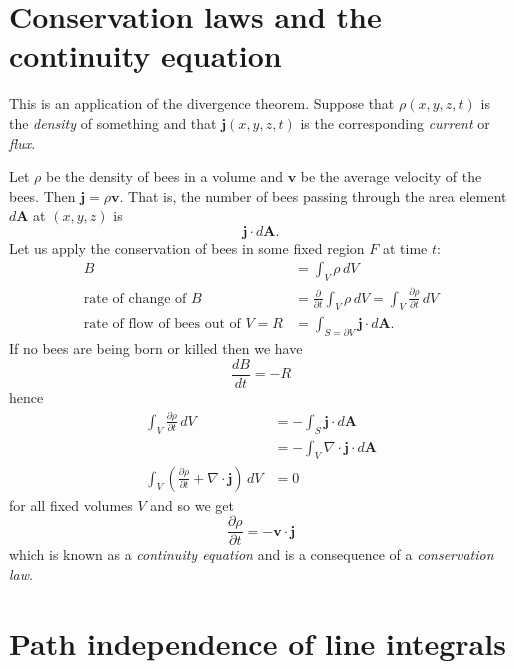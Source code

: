 \section{Conservation laws and the continuity equation}

This is an application of the divergence theorem.
Suppose that $\rho(x,y,z,t)$ is the \emph{density} of something
and that $\bm j(x,y,z,t)$ is the corresponding \emph{current} or \emph{flux}.

\begin{example}[Bees]
    Let $\rho$ be the density of bees in a volume
    and $\bm v$ be the average velocity of the bees.
    Then $\bm j = \rho \bm v$.
    That is,
    the number of bees passing through the area element $d\bm A$
    at $(x,y,z)$ is
    \[
        \bm j \cdot d \bm A.
    \]
    Let us apply the conservation of bees in some fixed region $F$ at time $t$:
    \begin{align*}
        B                                          &= \int_V \rho \,dV \\
        \text{rate of change of $B$}               &= \frac{\partial}{\partial t} 
            \int_V \rho \,dV = \int_V \frac{\partial\rho}{\partial t} \,dV \\
        \text{rate of flow of bees out of $V$} = R &= \int_{S=\partial V}
            \bm j \cdot d\bm A.
    \end{align*}
    If no bees are being born or killed then we have
    \[
        \frac{dB}{dt} = -R
    \]
    hence
    \begin{align*}
        \int_V \frac{\partial\rho}{\partial t} \,dV
        &= -\int_S \bm j \cdot d\bm A \\
        &= -\int_V \nabla \cdot \bm j \cdot d\bm A \tag{div thm} \\
        \int_V 
        \left(
            \frac{\partial\rho}{\partial t} + \nabla \cdot \bm j
        \right)
        \,dV &= 0
    \end{align*}
    for all fixed volumes $V$ and so we get 
    \[
        \frac{\partial \rho}{\partial t} = -\bm v \cdot \bm j
    \]
    which is known as a \emph{continuity equation} and is a consequence of a
    \emph{conservation law}.
\end{example}

\section{Path independence of line integrals}

